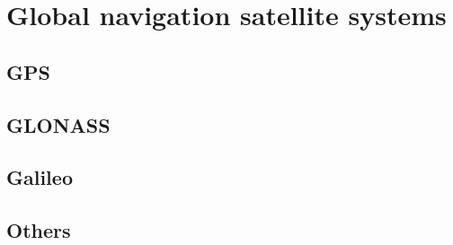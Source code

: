 \section{Global navigation satellite systems}

\subsection{GPS}

\subsection{GLONASS}

\subsection{Galileo}

\subsection{Others}




